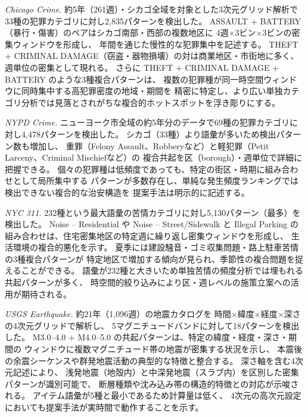 \emph{Chicago Crime.}
約5年（261週）・シカゴ全域を対象とした3次元グリッド解析で
33種の犯罪カテゴリに対し2,835パターンを検出した。
ASSAULT + BATTERY（暴行・傷害）のペアはシカゴ南部・西部の複数地区に
4週$\times$3ビン$\times$3ビンの密集ウィンドウを形成し、
年間を通じた慢性的な犯罪集中を記述する。
THEFT + CRIMINAL DAMAGE（窃盗・器物損壊）の対は商業地区・市街地に多く、
週単位の密集として現れる。
さらに THEFT + CRIMINAL DAMAGE + BATTERY のような3種複合パターンは、
複数の犯罪種が同一時空間ウィンドウに同時集中する高犯罪密度の地域・期間を
精密に特定し、より広い単独カテゴリ分析では見落とされがちな複合的ホットスポットを浮き彫りにする。

\emph{NYPD Crime.}
ニューヨーク市全域の約5年分のデータで69種の犯罪カテゴリに対し4,478パターンを検出した。
シカゴ（33種）より語彙が多いため検出パターン数も増加し、
重罪（Felony Assault、Robberyなど）と軽犯罪（Petit Larceny、Criminal Mischiefなど）の
複合共起を区（borough）・週単位で詳細に把握できる。
個々の犯罪種は低頻度であっても、特定の街区・時期に組み合わせとして局所集中する
パターンが多数存在し、単純な発生頻度ランキングでは検出できない複合的な治安構造を
提案手法は明示的に記述する。

\emph{NYC 311.}
232種という最大語彙の苦情カテゴリに対し5,130パターン（最多）を検出した。
Noise -- Residential や Noise -- Street/Sidewalk と
Illegal Parking の組み合わせは、住宅密集地区の特定週に繰り返し密集ウィンドウを形成し、
生活環境の複合的悪化を示す。
夏季には建設騒音・ゴミ収集問題・路上駐車苦情の3種複合パターンが
特定地区で増加する傾向が見られ、季節性の複合問題を捉えることができる。
語彙が232種と大きいため単独苦情の頻度分析では埋もれる共起パターンが多く、
時空間的絞り込みにより区・週レベルの施策立案への活用が期待される。

\emph{USGS Earthquake.}
約21年（1,096週）の地震カタログを
時間$\times$緯度$\times$経度$\times$深さの4次元グリッドで解析し、
5マグニチュードバンドに対して18パターンを検出した。
M3.0--4.0 + M4.0--5.0 の共起パターンは、特定の緯度・経度・深さ・期間の
ウィンドウに複数マグニチュード帯の地震が密集する状況を示し、
本震後の余震シーケンスや群発地震活動の典型的な特徴と整合する。
深さ軸を含む4次元記述により、
浅発地震（地殻内）と中深発地震（スラブ内）を区別した密集パターンが識別可能で、
断層種類や沈み込み帯の構造的特徴との対応が示唆される。
アイテム語彙が5種と最小であるため計算量は低く、
4次元の高次元設定においても提案手法が実時間で動作することを示す。
